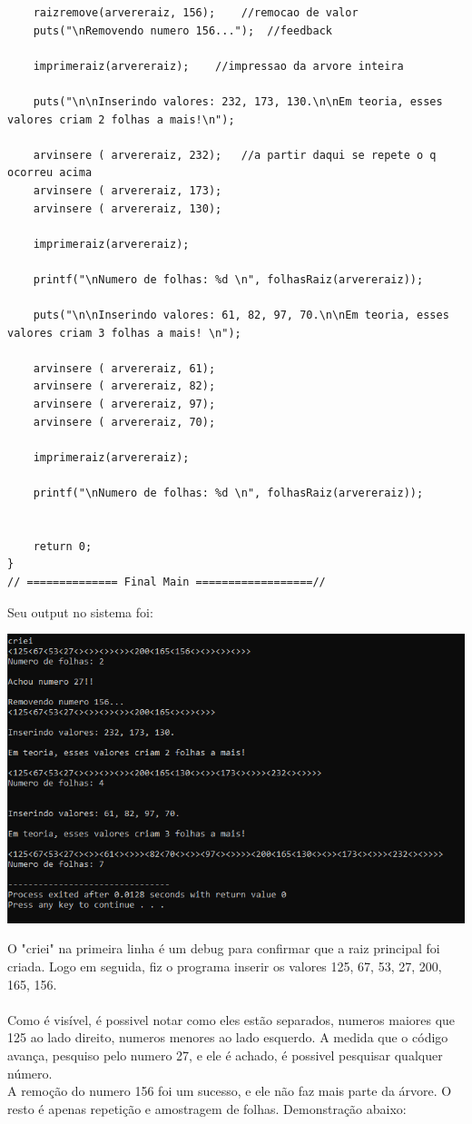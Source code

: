 \documentclass[11pt]{article} %
\begin{document}
\begin{enumerate}[a)]
\begin{lstlisting}
	raizremove(arvereraiz, 156);	//remocao de valor
	puts("\nRemovendo numero 156...");	//feedback
	
	imprimeraiz(arvereraiz);	//impressao da arvore inteira
	
	puts("\n\nInserindo valores: 232, 173, 130.\n\nEm teoria, esses valores criam 2 folhas a mais!\n");
	
	arvinsere ( arvereraiz, 232); 	//a partir daqui se repete o q ocorreu acima
	arvinsere ( arvereraiz, 173); 
	arvinsere ( arvereraiz, 130); 
	
	imprimeraiz(arvereraiz);
	
	printf("\nNumero de folhas: %d \n", folhasRaiz(arvereraiz));
	
	puts("\n\nInserindo valores: 61, 82, 97, 70.\n\nEm teoria, esses valores criam 3 folhas a mais! \n");
	
	arvinsere ( arvereraiz, 61); 
	arvinsere ( arvereraiz, 82); 
	arvinsere ( arvereraiz, 97); 
	arvinsere ( arvereraiz, 70); 
	
	imprimeraiz(arvereraiz);
	
	printf("\nNumero de folhas: %d \n", folhasRaiz(arvereraiz));
	
	
	return 0;
}
// ============== Final Main ==================//
\end{lstlisting}

Seu output no sistema foi:

			\includegraphics[scale = 0.8]{codigo.png}

O "criei" na primeira linha é um debug para confirmar que a raiz principal foi criada.
Logo em seguida, fiz o programa inserir os valores 125, 67, 53, 27, 200, 165, 156. \\ \\
Como é visível, é possivel notar como eles estão separados, numeros maiores que 125 ao lado direito, numeros menores ao lado esquerdo. A medida que o código avança, pesquiso pelo numero 27, e ele é achado, é possivel pesquisar qualquer número.
\\
A remoção do numero 156 foi um sucesso, e ele não faz mais parte da árvore. O resto é apenas repetição e amostragem de folhas. Demonstração abaixo: \\ \\


\end{enumerate}
\end{document}
